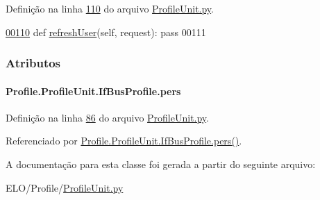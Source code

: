Definição na linha \hyperlink{ProfileUnit_8py_source_l00110}{110} do arquivo \hyperlink{ProfileUnit_8py_source}{Profile\+Unit.\+py}.


\begin{DoxyCode}
\hypertarget{classProfile_1_1ProfileUnit_1_1IfBusProfile_l00110}{}\hyperlink{classProfile_1_1ProfileUnit_1_1IfBusProfile_a29418660237655a745c52eff725c7176}{00110}     \textcolor{keyword}{def }\hyperlink{classProfile_1_1ProfileUnit_1_1IfBusProfile_a29418660237655a745c52eff725c7176}{refreshUser}(self, request): \textcolor{keyword}{pass}
00111 
\end{DoxyCode}


\subsubsection{Atributos}
\hypertarget{classProfile_1_1ProfileUnit_1_1IfBusProfile_abe265adaf3fd39d6534f9ad4c9ba8abb}{}
\paragraph[{pers}]{\setlength{\rightskip}{0pt plus 5cm}Profile.\+Profile\+Unit.\+If\+Bus\+Profile.\+pers}\label{classProfile_1_1ProfileUnit_1_1IfBusProfile_abe265adaf3fd39d6534f9ad4c9ba8abb}


Definição na linha \hyperlink{ProfileUnit_8py_source_l00086}{86} do arquivo \hyperlink{ProfileUnit_8py_source}{Profile\+Unit.\+py}.



Referenciado por \hyperlink{classProfile_1_1ProfileUnit_1_1IfBusProfile_acf7fb65f3c12a9a210189c09d3ef1b00}{Profile.\+Profile\+Unit.\+If\+Bus\+Profile.\+pers()}.



A documentação para esta classe foi gerada a partir do seguinte arquivo\+:\begin{DoxyCompactItemize}
\item 
E\+L\+O/\+Profile/\hyperlink{ProfileUnit_8py}{Profile\+Unit.\+py}\end{DoxyCompactItemize}
